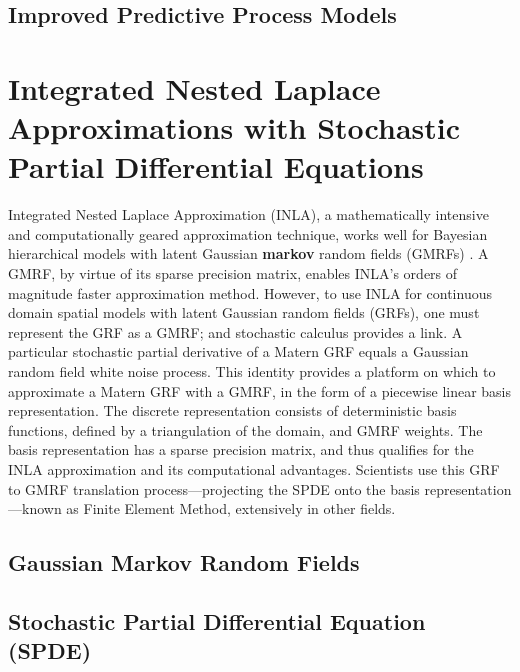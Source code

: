 \subsection{Improved Predictive Process Models}


\section{Integrated Nested Laplace Approximations with Stochastic Partial Differential Equations} %
Integrated Nested Laplace Approximation (INLA), a mathematically intensive and computationally geared approximation technique, works well for Bayesian hierarchical models with latent Gaussian {\bf markov} random fields (GMRFs) \citep{Rue2007}. A GMRF, by virtue of its sparse precision matrix, enables INLA's orders of magnitude faster approximation method. However, to use INLA for continuous domain spatial models with latent Gaussian random fields (GRFs), one must represent the GRF as a GMRF; and stochastic calculus provides a link. A particular stochastic partial derivative of a Matern GRF equals a Gaussian random field white noise process. This identity provides a platform on which to approximate a Matern GRF with a GMRF, in the form of a piecewise linear basis representation. The discrete representation consists of deterministic basis functions, defined by a triangulation of the domain, and GMRF weights. The basis representation has a sparse precision matrix, and thus qualifies for the INLA approximation and its computational advantages. Scientists use this GRF to GMRF translation process---projecting the SPDE onto the basis representation---known as Finite Element Method, extensively in other fields. 
\subsection{Gaussian Markov Random Fields}

\subsection{Stochastic Partial Differential Equation (SPDE)} 

